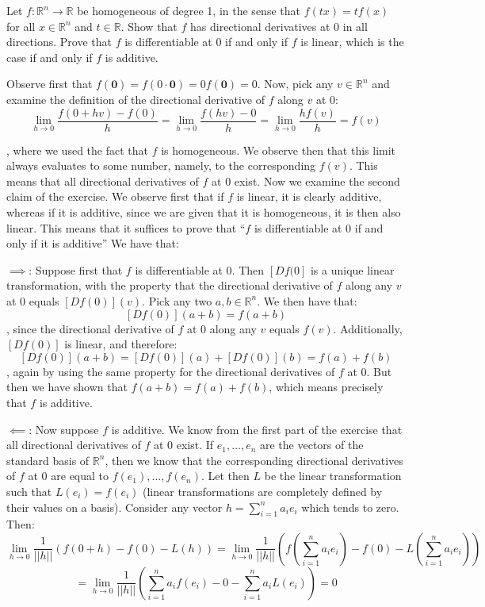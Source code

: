 \begin{exercise}{9}
    Let $f: \mathbb{R}^n \rightarrow \mathbb{R}$ be homogeneous of degree 1, in the sense that $f(tx) = tf(x)$ for all $x \in \mathbb{R}^n$ and $t \in \mathbb{R}$. Show that $f$ has directional derivatives at 0 in all directions. Prove that $f$ is differentiable at 0 if and only if $f$ is linear, which is the case if and only if $f$ is additive.
\end{exercise}

\begin{solution}

    Observe first that $f(\mathbf{0}) = f(0 \cdot \mathbf{0}) = 0f(\mathbf{0}) = 0$. Now, pick any $v \in \mathbb{R}^n$ and examine the definition of the directional derivative of $f$ along $v$ at 0:
    $$\lim_{h \rightarrow 0} \frac{f(0 + hv) - f(0)}{h} = \lim_{h\rightarrow 0}\frac{f(hv) - 0}{h} = \lim_{h \rightarrow 0} \frac{hf(v)}{h} = f(v)$$

    , where we used the fact that $f$ is homogeneous. 
    We observe then that this limit always evaluates to some number, namely, to the corresponding $f(v)$. 
    This means that all directional derivatives of $f$ at 0 exist. 
    Now we examine the second claim of the exercise. 
    We observe first that if $f$ is linear, it is clearly additive, whereas if it is additive, since we are given that it is homogeneous, it is then also linear. 
    This means that it suffices to prove that ``$f$ is differentiable at 0 if and only if it is additive''
    We have that:

    $\implies$: Suppose first that $f$ is differentiable at 0.
    Then $[D f(0]$ is a unique linear transformation, with the property that the directional derivative of $f$ along any $v$ at 0 equals $[D f(0)](v)$.
    Pick any two $a, b \in \mathbb{R}^n$.
    We then have that:
    $$[D f(0)](a+b) = f(a+b)$$
    , since the directional derivative of $f$ at 0 along any $v$ equals $f(v)$. 
    Additionally, $[D f(0)]$ is linear, and therefore:
    $$[D f(0)](a+b) = [D f(0)](a) + [D f(0)](b) = f(a) + f(b)$$
    , again by using the same property for the directional derivatives of $f$ at 0.
    But then we have shown that $f(a+b) = f(a) + f(b)$, which means precisely that $f$ is additive.

    $\impliedby$: Now suppose $f$ is additive. 
    We know from the first part of the exercise that all directional derivatives of $f$ at 0 exist. 
    If $e_1, \ldots, e_n$ are the vectors of the standard basis of $\mathbb{R}^n$, then we know that the corresponding directional derivatives of $f$ at 0 are equal to $f(e_1), \ldots, f(e_n)$.
    Let then $L$ be the linear transformation such that $L(e_i) = f(e_i)$ (linear transformations are completely defined by their values on a basis).
    Consider any vector $h = \sum_{i=1}^{n} a_i e_i$ which tends to zero.
    Then:
    $$\lim_{h \rightarrow 0} \frac{1}{\lvert \lvert h \rvert \rvert}( f(0+ h) - f(0) - L(h) ) = \lim_{h \rightarrow 0} \frac{1}{\lvert \lvert h \rvert \rvert} ( f(\sum_{i=1}^{n} a_i e_i) - f(0) - L(\sum_{i=1}^{n} a_i e_i) )$$
    $$= \lim_{h \rightarrow 0} \frac{1}{\lvert \lvert h \rvert \rvert}( \sum_{i=1}^{n} a_i f(e_i) - 0 - \sum_{i=1}^{n} a_i L(e_i) ) = 0$$


\end{solution}
